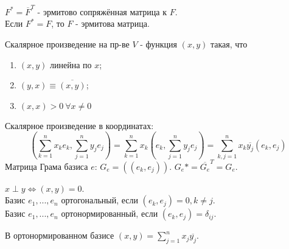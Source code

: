 \begin{definition}
    $F^* = \overline{F}^T$ - эрмитово сопряжённая матрица к $F$.\\
    Если $F^* = F$, то $F$ - эрмитова матрица.
\end{definition} 
\begin{definition}
    Скалярное произведение на пр-ве $V$ - функция $(x,y)$ такая, что
    \begin{enumerate}
        \item $(x,y)$ линейна по $x$;
        \item $(y,x) \equiv \overline{(x,y)}$;
        \item $(x,x) > 0 \ \forall x \neq 0$
    \end{enumerate}
\end{definition}
Скалярное произведение в координатах:
$$(\sum \limits_{k=1}^n x_ke_k, \sum \limits_{j=1}^n y_je_j) = \sum \limits_{k=1}^n x_k(e_k, \sum \limits_{j=1}^n y_je_j) = \sum \limits_{k, j=1}^n x_k\overline{y_j}(e_k, e_j)$$
Матрица Грама базиса $e$: $G_e = ((e_k, e_j))$. $G_e* = \overline{G_e}^T = G_e$.
\begin{definition}
    $x \perp y \Longleftrightarrow (x, y) = 0$.\\
    Базис $e_1,...,e_n$ ортогональный, если $(e_k, e_j) = 0, k \neq j$.\\
    Базис $e_1,...,e_n$ ортонормированный, если $(e_k, e_j) = \delta_{ij}$.
\end{definition}
В ортонормированном базисе $(x, y) = \sum \limits_{j=1}^n x_j\overline{y_j}$.

